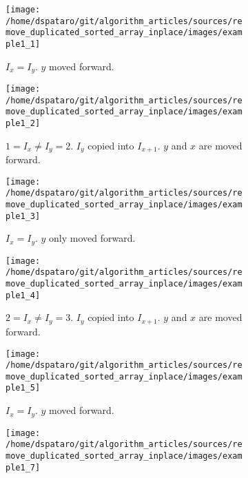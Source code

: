\begin{figure}
	\centering
	\vspace*{0.0in}
	\begin{subfigure}[t]{0.49\textwidth}
		\texttt{[image: /home/dspataro/git/algorithm\_articles/sources/remove\_duplicated\_sorted\_array\_inplace/images/example1\_1]}
		\vspace*{-8mm}
		\caption{$I_x = I_y$. $y$ moved forward.}
		\label{fig:remove_duplicated_sorted_array_inplace:example1_1}
	 \end{subfigure}
	 \hfill
	 \begin{subfigure}[t]{0.49\textwidth}
		\texttt{[image: /home/dspataro/git/algorithm\_articles/sources/remove\_duplicated\_sorted\_array\_inplace/images/example1\_2]}
		\vspace*{-8mm}
		\caption{$1 = I_x \neq I_y = 2$. $I_y$ copied into $I_{x+1}$. $y$ and $x$ are moved forward.}
		\label{fig:remove_duplicated_sorted_array_inplace:example1_2}
	 \end{subfigure}
	 \hfill
	 \begin{subfigure}[t]{0.49\textwidth}
		\texttt{[image: /home/dspataro/git/algorithm\_articles/sources/remove\_duplicated\_sorted\_array\_inplace/images/example1\_3]}
		\vspace*{-8mm}
		\caption{$I_x = I_y$. $y$ only moved forward.}
		\label{fig:remove_duplicated_sorted_array_inplace:example1_3}
	 \end{subfigure}
	 \hfill
	 \begin{subfigure}[t]{0.49\textwidth}
		\texttt{[image: /home/dspataro/git/algorithm\_articles/sources/remove\_duplicated\_sorted\_array\_inplace/images/example1\_4]}
		\vspace*{-8mm}
		\caption{$2 = I_x \neq I_y = 3$. $I_y$ copied into $I_{x+1}$. $y$ and $x$ are moved forward.}
		\label{fig:remove_duplicated_sorted_array_inplace:example1_4}
	 \end{subfigure}
	 \hfill
	 \begin{subfigure}[t]{0.49\textwidth}
		\texttt{[image: /home/dspataro/git/algorithm\_articles/sources/remove\_duplicated\_sorted\_array\_inplace/images/example1\_5]}
		\vspace*{-8mm}
		\caption{$I_x = I_y$. $y$ moved forward.}
		\label{fig:remove_duplicated_sorted_array_inplace:example1_5}
	 \end{subfigure}
	 \hfill
	 \begin{subfigure}[t]{0.49\textwidth}
		\texttt{[image: /home/dspataro/git/algorithm\_articles/sources/remove\_duplicated\_sorted\_array\_inplace/images/example1\_7]}

\end{subfigure}
\end{figure}
